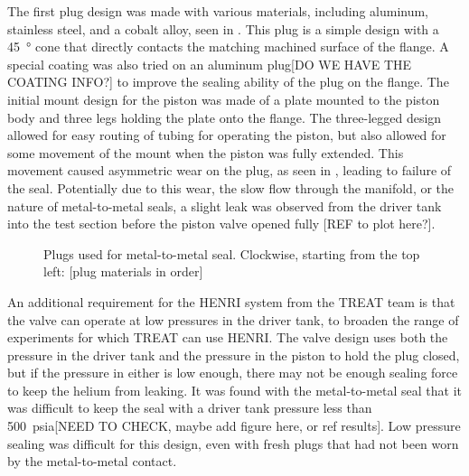 The first plug design was made with various materials, including aluminum, stainless steel, and a cobalt alloy, seen in . This plug is a simple design with a \SI{45}{\degree} cone that directly contacts the matching machined surface of the flange. A special coating was also tried on an aluminum plug[DO WE HAVE THE COATING INFO?] to improve the sealing ability of the plug on the flange. The initial mount design for the piston was made of a plate mounted to the piston body and three legs holding the plate onto the flange. The three-legged design allowed for easy routing of tubing for operating the piston, but also allowed for some movement of the mount when the piston was fully extended. This movement caused asymmetric wear on the plug, as seen in , leading to failure of the seal. Potentially due to this wear, the slow flow through the manifold, or the nature of metal-to-metal seals, a slight leak was observed from the driver tank into the test section before the piston valve opened fully [REF to plot here?].
\begin{figure}[htbp]
    \vspace{16pt}
    \centering
    \caption{Plugs used for metal-to-metal seal. Clockwise, starting from the top left: [plug materials in order]}
    \label{fig:metal plugs}
    \vspace{16pt}
\end{figure}

An additional requirement for the HENRI system from the TREAT team is that the valve can operate at low pressures in the driver tank, to broaden the range of experiments for which TREAT can use HENRI. The valve design uses both the pressure in the driver tank and the pressure in the piston to hold the plug closed, but if the pressure in either is low enough, there may not be enough sealing force to keep the helium from leaking. It was found with the metal-to-metal seal that it was difficult to keep the seal with a driver tank pressure less than \SI{500}{psia}[NEED TO CHECK, maybe add figure here, or ref results]. Low pressure sealing was difficult for this design, even with fresh plugs that had not been worn by the metal-to-metal contact.

